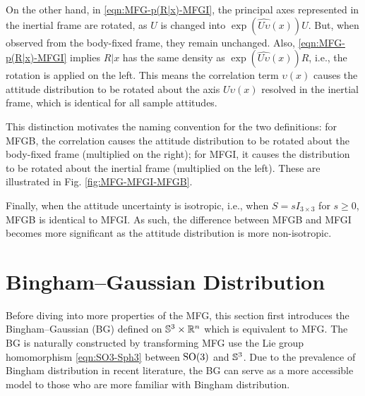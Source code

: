 On the other hand, in \eqref{eqn:MFG-p(R|x)-MFGI}, the principal axes represented in the inertial frame are rotated, as $U$ is changed into $\exp(\widehat{U\upsilon}(x))U$. 
But, when observed from the body-fixed frame, they remain unchanged. 
Also, \eqref{eqn:MFG-p(R|x)-MFGI} implies $R|x$ has the same density as $\exp(\widehat{U\upsilon}(x))R$, i.e., the rotation is applied on the left. 
This means the correlation term $\upsilon(x)$ causes the attitude distribution to be rotated about the axis $U\upsilon(x)$ resolved in the inertial frame, which is identical for all sample attitudes.

This distinction motivates the naming convention for the two definitions: for MFGB, the correlation causes the attitude distribution to be rotated about the body-fixed frame (multiplied on the right); for MFGI, it causes the distribution to be rotated about the inertial frame (multiplied on the left).
These are illustrated in Fig. \ref{fig:MFG-MFGI-MFGB}.

Finally, when the attitude uncertainty is isotropic, i.e., when $S=sI_{3\times 3}$ for $s \geq 0$, MFGB is identical to MFGI.
As such, the difference between MFGB and MFGI becomes more significant as the attitude distribution is more non-isotropic.

\section{Bingham--Gaussian Distribution}

Before diving into more properties of the MFG, this section first introduces the Bingham--Gaussian (BG) defined on $\mathbb{S}^3\times \mathbb{R}^n$ which is equivalent to MFG.
The BG is naturally constructed by transforming MFG use the Lie group homomorphism \eqref{eqn:SO3-Sph3} between $\mathrm{SO}(3)$ and $\mathbb{S}^3$.
Due to the prevalence of Bingham distribution in recent literature, the BG can serve as a more accessible model to those who are more familiar with Bingham distribution.

